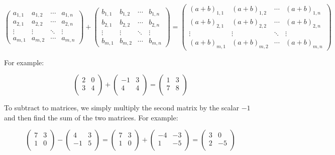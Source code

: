 \documentclass[a4paper,oneside]{report}
\begin{document}
\[ \begin{pmatrix}
	a_{1,1} & a_{1,2} & \cdots & a_{1,n} \\
	a_{2,1} & a_{2,2} & \cdots & a_{2,n} \\
	\vdots  & \vdots  & \ddots & \vdots  \\
	a_{m,1} & a_{m,2} & \cdots & a_{m,n}
\end{pmatrix} + \begin{pmatrix}
	b_{1,1} & b_{1,2} & \cdots & b_{1,n} \\
	b_{2,1} & b_{2,2} & \cdots & b_{2,n} \\
	\vdots  & \vdots  & \ddots & \vdots  \\
	b_{m,1} & b_{m,2} & \cdots & b_{m,n}
\end{pmatrix} = \begin{pmatrix}
	(a + b)_{1,1} & (a + b)_{1,2} & \cdots & (a + b)_{1,n} \\
	(a + b)_{2,1} & (a + b)_{2,2} & \cdots & (a + b)_{2,n} \\
	\vdots  & \vdots  & \ddots & \vdots  \\
	(a + b)_{m,1} & (a + b)_{m,2} & \cdots & (a + b)_{m,n}
\end{pmatrix} \]

For example:

\[ \begin{pmatrix}
	2 & 0 \\
	3 & 4 \\
\end{pmatrix} + \begin{pmatrix}
	-1 & 3 \\
	4 & 4 \\
\end{pmatrix} = \begin{pmatrix}
	1 & 3 \\
	7 & 8 \\
\end{pmatrix} \]

To subtract to matrices, we simply multiply the second matrix by the scalar
\( -1 \) and then find the sum of the two matrices. For example:

\[ \begin{pmatrix}
	7 & 3 \\
	1 & 0 \\
\end{pmatrix} - \begin{pmatrix}
	4 & 3 \\
	-1 & 5 \\
\end{pmatrix} = \begin{pmatrix}
	7 & 3 \\
	1 & 0 \\
\end{pmatrix} + \begin{pmatrix}
	-4 & -3 \\
	1 & -5 \\
\end{pmatrix} = \begin{pmatrix}
	3 & 0 \\
	2 & -5 \\
\end{pmatrix} \]
\end{document}
